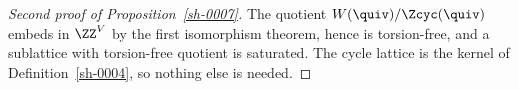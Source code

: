 \begin{proof}[Second proof of Proposition~\ref{sh-0007}]\label{sh-0010}
The quotient $W(\quiv) / \Zcyc(\quiv)$ embeds in $\ZZ^{V}$ by the first isomorphism theorem, hence is torsion-free, and a sublattice with torsion-free quotient is saturated. The cycle lattice is the kernel of Definition~\ref{sh-0004}, so nothing else is needed.
\end{proof}